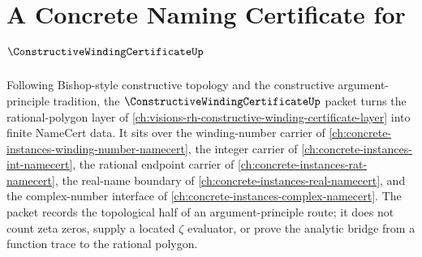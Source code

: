 \chapter{A Concrete Naming Certificate for $\ConstructiveWindingCertificateUp$}
\label{ch:concrete-instances-constructive-winding-certificate-namecert}

Following Bishop-style constructive topology and the constructive argument-principle tradition, the $\ConstructiveWindingCertificateUp$ packet turns the rational-polygon layer of \autoref{ch:visions-rh-constructive-winding-certificate-layer} into finite NameCert data. It sits over the winding-number carrier of \autoref{ch:concrete-instances-winding-number-namecert}, the integer carrier of \autoref{ch:concrete-instances-int-namecert}, the rational endpoint carrier of \autoref{ch:concrete-instances-rat-namecert}, the real-name boundary of \autoref{ch:concrete-instances-real-namecert}, and the complex-number interface of \autoref{ch:concrete-instances-complex-namecert}. The packet records the topological half of an argument-principle route; it does not count zeta zeros, supply a located $\zeta$ evaluator, or prove the analytic bridge from a function trace to the rational polygon.

